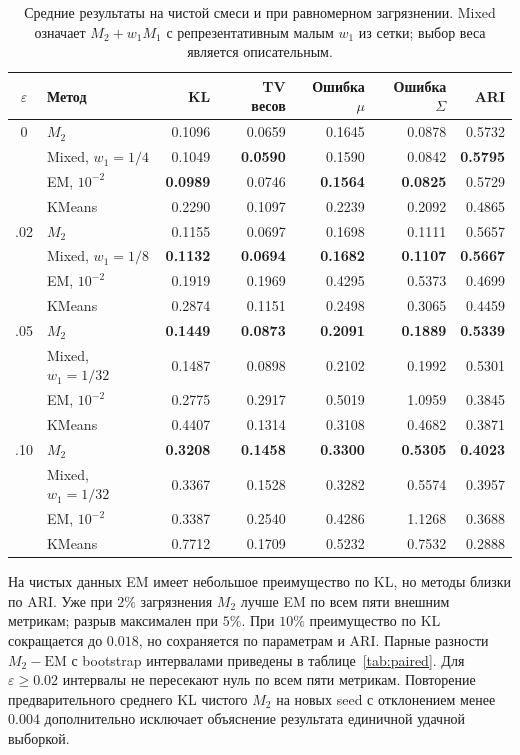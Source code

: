 \documentclass[11pt,a4paper]{article}
\newcommand{\best}[1]{\textbf{\color{green}#1}}
\newcommand{\Mone}{M_1}
\newcommand{\Mtwo}{M_2}
\begin{document}
\begin{table}[ht]
\centering
\small
\caption{Средние результаты на чистой смеси и при равномерном загрязнении.
Mixed означает $\Mtwo+w_1\Mone$ с репрезентативным малым $w_1$ из сетки;
выбор веса является описательным.}
\label{tab:main}
\begin{tabularx}{\linewidth}{@{}clrrrrr@{}}
\toprule
$\varepsilon$ & Метод & KL & TV весов & Ошибка $\mu$ & Ошибка $\Sigma$ & ARI \\
\midrule
0 & $\Mtwo$ & 0.1096 & 0.0659 & 0.1645 & 0.0878 & 0.5732 \\
  & Mixed, $w_1=1/4$ & 0.1049 & \best{0.0590} & 0.1590 & 0.0842 & \best{0.5795} \\
  & EM, $10^{-2}$ & \best{0.0989} & 0.0746 & \best{0.1564} & \best{0.0825} & 0.5729 \\
  & KMeans & 0.2290 & 0.1097 & 0.2239 & 0.2092 & 0.4865 \\
\addlinespace
.02 & $\Mtwo$ & 0.1155 & 0.0697 & 0.1698 & 0.1111 & 0.5657 \\
  & Mixed, $w_1=1/8$ & \best{0.1132} & \best{0.0694} & \best{0.1682} & \best{0.1107} & \best{0.5667} \\
  & EM, $10^{-2}$ & 0.1919 & 0.1969 & 0.4295 & 0.5373 & 0.4699 \\
  & KMeans & 0.2874 & 0.1151 & 0.2498 & 0.3065 & 0.4459 \\
\addlinespace
.05 & $\Mtwo$ & \best{0.1449} & \best{0.0873} & \best{0.2091} & \best{0.1889} & \best{0.5339} \\
  & Mixed, $w_1=1/32$ & 0.1487 & 0.0898 & 0.2102 & 0.1992 & 0.5301 \\
  & EM, $10^{-2}$ & 0.2775 & 0.2917 & 0.5019 & 1.0959 & 0.3845 \\
  & KMeans & 0.4407 & 0.1314 & 0.3108 & 0.4682 & 0.3871 \\
\addlinespace
.10 & $\Mtwo$ & \best{0.3208} & \best{0.1458} & \best{0.3300} & \best{0.5305} & \best{0.4023} \\
  & Mixed, $w_1=1/32$ & 0.3367 & 0.1528 & 0.3282 & 0.5574 & 0.3957 \\
  & EM, $10^{-2}$ & 0.3387 & 0.2540 & 0.4286 & 1.1268 & 0.3688 \\
  & KMeans & 0.7712 & 0.1709 & 0.5232 & 0.7532 & 0.2888 \\
\bottomrule
\end{tabularx}
\end{table}

На чистых данных EM имеет небольшое преимущество по KL, но методы близки по
ARI. Уже при $2\%$ загрязнения $\Mtwo$ лучше EM по всем пяти внешним
метрикам; разрыв максимален при $5\%$. При $10\%$ преимущество по KL
сокращается до $0.018$, но сохраняется по параметрам и ARI. Парные разности
$\Mtwo-\mathrm{EM}$ с bootstrap интервалами приведены в
таблице~\ref{tab:paired}. Для $\varepsilon\geq0.02$ интервалы не пересекают
нуль по всем пяти метрикам. Повторение предварительного среднего KL чистого
$\Mtwo$ на новых seed с отклонением менее $0.004$ дополнительно исключает
объяснение результата единичной удачной выборкой.
\end{document}

